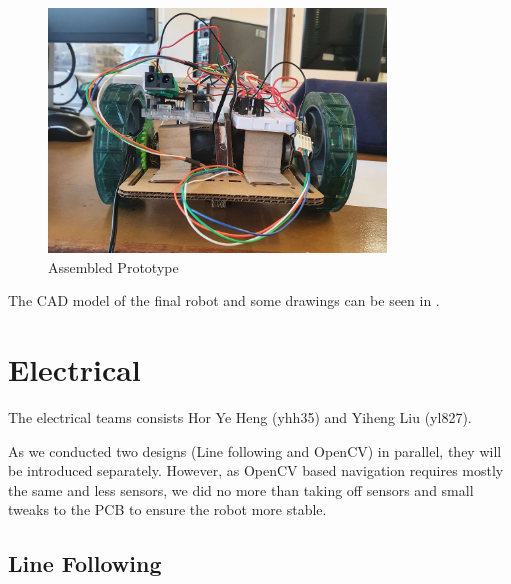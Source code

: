 \documentclass{article}
\begin{document}
\begin{figure}[!h]
    \centering
    \includegraphics[width=0.8\textwidth]{assets/assembled_prototype.jpg}
    \caption{Assembled Prototype}
    \label{fig:assembled_prototype}
\end{figure}

The CAD model of the final robot and some drawings can be seen in .

\section{Electrical}
\quad The electrical teams consists Hor Ye Heng (yhh35) and Yiheng Liu (yl827). 

As we conducted two designs (Line following and OpenCV) in parallel, they will be introduced separately. However, as OpenCV based navigation requires mostly the same and less sensors, we did no more than taking off sensors and small tweaks to the PCB to ensure the robot more stable.
\subsection{Line Following}
\end{document}
